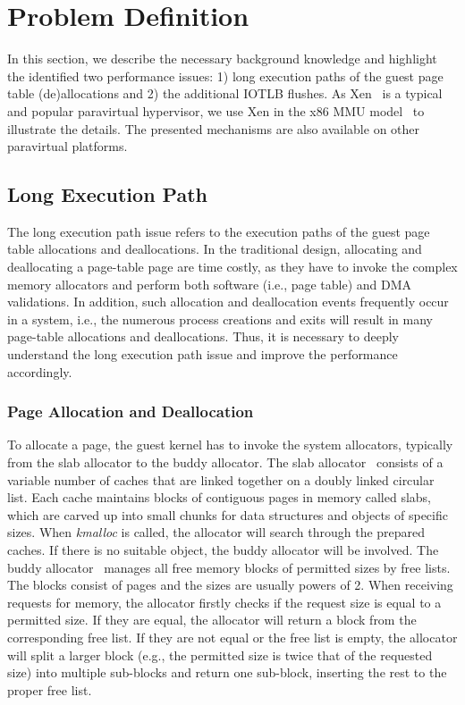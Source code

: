 \section{Problem Definition} \label{sec:prob}
In this section, we describe the necessary background knowledge and highlight the identified two performance issues: 1) long execution paths of the guest page table (de)allocations and 2) the additional IOTLB flushes.
As Xen~\cite{XEN-SOSP03} is a typical and popular paravirtual hypervisor, we use Xen in the x86 MMU model~\cite{x86-pv-model} to illustrate the details.
The presented mechanisms are also available on other paravirtual platforms.


\subsection{Long Execution Path}\label{sec:longpath}
The long execution path issue refers to the execution paths of the guest page table allocations and deallocations.
In the traditional design, allocating and deallocating a page-table page are time costly, as they have to invoke the complex memory allocators and perform both software (i.e., page table) and DMA validations.
In addition, such allocation and deallocation events frequently occur in a system, i.e., the numerous process creations and exits will result in many page-table allocations and deallocations.
Thus, it is necessary to deeply understand the long execution path issue and improve the performance accordingly.

\subsubsection{Page Allocation and Deallocation}
To allocate a page, the guest kernel has to invoke the system allocators, typically from the slab allocator to the buddy allocator.
The slab allocator~\cite{slaballocator} consists of a variable number of caches that are linked together on a doubly linked circular list.
Each cache maintains blocks of contiguous pages in memory called slabs, which are carved up into small chunks for data structures and objects of specific sizes.
When \emph{kmalloc} is called, the allocator will search through the prepared caches.
If there is no suitable object, the buddy allocator will be involved.
The buddy allocator~\cite{buddyallocator} manages all free memory blocks of permitted sizes by free lists. The blocks consist of pages and the sizes are usually powers of 2.
When receiving requests for memory, the allocator firstly checks if the request size is equal to a permitted size. If they are equal, the allocator will return a block from the corresponding free list. If they are not equal or the free list is empty, the allocator will split a larger block (e.g., the permitted size is twice that of the requested size) into multiple sub-blocks and return one sub-block, inserting the rest to the proper free list.

